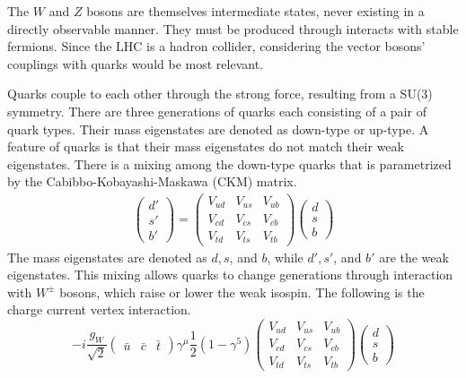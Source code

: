 The $W$ and $Z$ bosons are themselves intermediate states,
never existing in a directly observable manner.
They must be produced through interacts with stable fermions.
Since the LHC is a hadron collider,
considering the vector bosons' couplings with quarks would be most
relevant. 

Quarks couple to each other through the strong force,
resulting from a SU(3) symmetry.
There are three generations of quarks each consisting of a pair of quark types.
Their mass eigenstates are denoted as down-type or up-type.
A feature of quarks is that their mass eigenstates do not match their weak eigenstates.
There is a mixing among the down-type quarks that is parametrized by the
Cabibbo-Kobayashi-Maskawa (CKM) matrix.
\begin{gather}
  \left(
  \begin{matrix}
    d' \\
    s' \\
    b'
  \end{matrix}
  \right)
  =
  \left(
  \begin{matrix}
    V_{ud} & V_{us} & V_{ub} \\
    V_{cd} & V_{cs} & V_{cb} \\
    V_{td} & V_{ts} & V_{tb}
  \end{matrix}
  \right)
  \left(
  \begin{matrix}
    d \\
    s \\
    b
  \end{matrix}
  \right) \label{eq:ckm}
\end{gather}
The mass eigenstates are denoted as $d, s$, and $b$,
while $d', s'$, and $b'$ are the weak eigenstates.
This mixing allows quarks to change generations through interaction with $W^\pm$ bosons,
which raise or lower the weak isospin.
The following is the charge current vertex interaction. 
\[
-i \frac{g_W}{\sqrt{2}}
\left(
\begin{matrix}
\bar{u} & \bar{c} & \bar{t}
\end{matrix}
\right)
\gamma^\mu \frac12 (1 - \gamma^5)
\left(
\begin{matrix}
  V_{ud} & V_{us} & V_{ub} \\
  V_{cd} & V_{cs} & V_{cb} \\
  V_{td} & V_{ts} & V_{tb}
\end{matrix}
\right)
\left(
\begin{matrix}
d \\ s \\ b
\end{matrix}
\right)
\]
